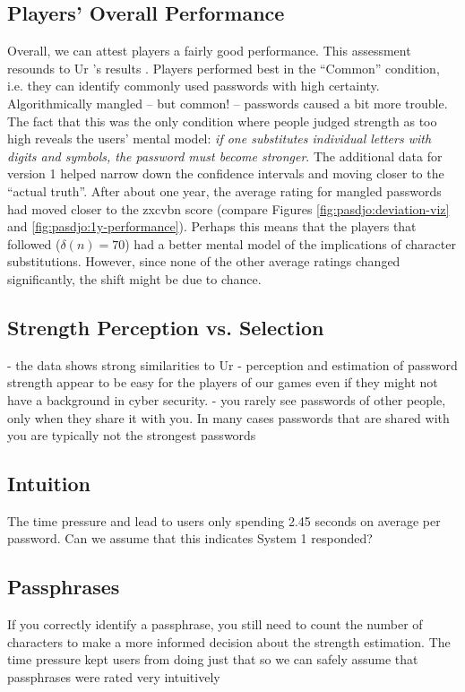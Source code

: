 \subsection{Players' Overall Performance}
Overall, we can attest players a fairly good performance. This assessment resounds to Ur \etal's results \cite{Ur2016PerceptionsPassword}. Players performed best in the ``Common'' condition, i.e. they can identify commonly used passwords with high certainty. Algorithmically mangled -- but common! -- passwords caused a bit more trouble. The fact that this was the only condition where people judged strength as too high reveals the users' mental model: \textit{if one substitutes individual letters with digits and symbols, the password must become stronger}. The additional data for version 1 helped narrow down the confidence intervals and moving closer to the ``actual truth''. After about one year, the average rating for mangled passwords had moved closer to the zxcvbn score (compare Figures \ref{fig:pasdjo:deviation-viz} and \ref{fig:pasdjo:1y-performance}). Perhaps this means that the players that followed ($\delta(n)=70$) had a better mental model of the implications of character substitutions. However, since none of the other average ratings changed significantly, the shift might be due to chance. 

\subsection{Strength Perception vs. Selection}
- the data shows strong similarities to Ur \etal \cite{Ur2016PerceptionsPassword}
- perception and estimation of password strength appear to be easy for the players of our games even if they might not have a background in cyber security. 
- you rarely see passwords of other people, only when they share it with you. In many cases passwords that are shared with you are typically not the strongest passwords \cite{Haque2014Hierarchy,  Shay2010EncounteringPasswordRequirements, Singh2007PasswordSharing, Violettas2014PasswordsAvoidGreece, Weirich2001PrettyGoodPersuasion, ZhangKennedy2016RevisitingPasswordRules} 

\subsection{Intuition}
The time pressure and lead to users only spending 2.45 seconds on average per password. Can we assume that this indicates System 1 responded?

\subsection{Passphrases}
If you correctly identify a passphrase, you still need to count the number of characters to make a more informed decision about the strength estimation. The time pressure kept users from doing just that so we can safely assume that passphrases were rated very intuitively %

